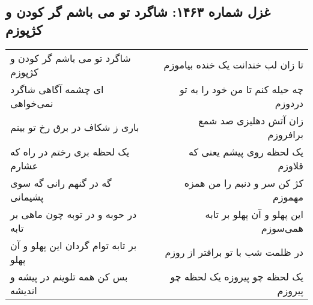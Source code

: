 \begin{center}
\section*{غزل شماره ۱۴۶۳: شاگرد تو می باشم گر کودن و کژپوزم}
\label{sec:1463}
\begin{longtable}{l p{0.5cm} r}
شاگرد تو می باشم گر کودن و کژپوزم
&&
تا زان لب خندانت یک خنده بیاموزم
\\
ای چشمه آگاهی شاگرد نمی‌خواهی
&&
چه حیله کنم تا من خود را به تو دردوزم
\\
باری ز شکاف در برق رخ تو بینم
&&
زان آتش دهلیزی صد شمع برافروزم
\\
یک لحظه بری رختم در راه که عشارم
&&
یک لحظه روی پیشم یعنی که قلاوزم
\\
گه در گنهم رانی گه سوی پشیمانی
&&
کژ کن سر و دنبم را من همزه مهموزم
\\
در حوبه و در توبه چون ماهی بر تابه
&&
این پهلو و آن پهلو بر تابه همی‌سوزم
\\
بر تابه توام گردان این پهلو و آن پهلو
&&
در ظلمت شب با تو براقتر از روزم
\\
بس کن همه تلوینم در پیشه و اندیشه
&&
یک لحظه چو پیروزه یک لحظه چو پیروزم
\\
\end{longtable}
\end{center}
